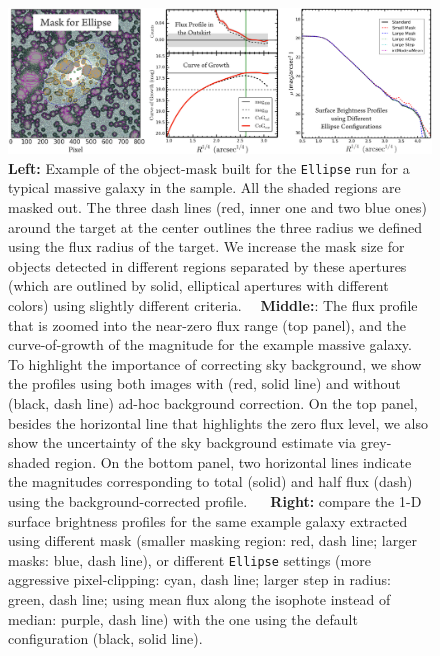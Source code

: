 \documentclass[a4paper,fleqn,usenatbib]{mnras}
\begin{document}
    \begin{figure}
        \centering 
        \includegraphics[width=\textwidth]{fig/redbcg_ellipse_tech}
        \caption{
            \textbf{Left:} Example of the object-mask built for the \texttt{Ellipse}
            run for a typical massive galaxy in the sample. 
            All the shaded regions are masked out. 
            The three dash lines (red, inner one and two blue ones) around the target 
            at the center outlines the three radius we defined using the flux radius 
            of the target.  
            We increase the mask size for objects detected in different regions 
            separated by these apertures (which are outlined by solid, elliptical 
            apertures with different colors) using slightly different criteria.~~
            \textbf{Middle:}: The flux profile that is zoomed into the near-zero flux 
            range (top panel), and the curve-of-growth of the magnitude for the example
            massive galaxy.  
            To highlight the importance of correcting sky background, we show the profiles 
            using both images with (red, solid line) and without (black, dash line) 
            ad-hoc background correction. 
            On the top panel, besides the horizontal line that highlights the zero flux 
            level, we also show the uncertainty of the sky background estimate via 
            grey-shaded region.  
            On the bottom panel, two horizontal lines indicate the magnitudes 
            corresponding to total (solid) and half flux (dash) using the 
            background-corrected profile. ~~
            \textbf{Right:} compare the 1-D surface brightness profiles for the same 
            example galaxy extracted using different mask 
            (smaller masking region: red, dash line; larger masks: blue, dash line), 
            or different \texttt{Ellipse} settings
            (more aggressive pixel-clipping: cyan, dash line; 
             larger step in radius: green, dash line; 
             using mean flux along the isophote instead of median: purple, dash line)
            with the one using the default configuration (black, solid line).
            }
        \label{fig:ell_tech}
    \end{figure}
\end{document}
